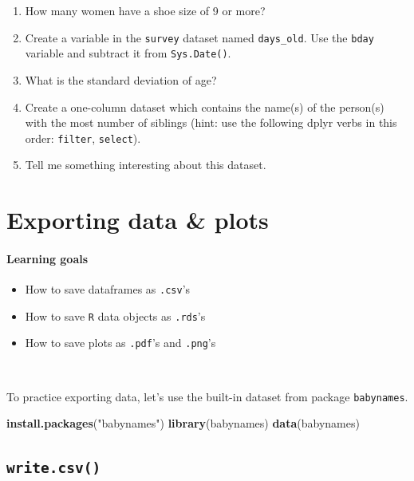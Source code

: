 \documentclass[
]{book}
\newenvironment{Shaded}{\begin{snugshade}}{\end{snugshade}}
\newcommand{\KeywordTok}[1]{\textcolor[rgb]{0.13,0.29,0.53}{\textbf{#1}}}
\newcommand{\NormalTok}[1]{#1}
\newcommand{\StringTok}[1]{\textcolor[rgb]{0.31,0.60,0.02}{#1}}
\providecommand{\tightlist}{%
  \setlength{\itemsep}{0pt}\setlength{\parskip}{0pt}}
\begin{document}
\begin{enumerate}
\item
  How many women have a shoe size of 9 or more?
\item
  Create a variable in the \texttt{survey} dataset named \texttt{days\_old}. Use the \texttt{bday} variable and subtract it from \texttt{Sys.Date()}.
\item
  What is the standard deviation of age?
\item
  Create a one-column dataset which contains the name(s) of the person(s) with the most number of siblings (hint: use the following dplyr verbs in this order: \texttt{filter}, \texttt{select}).
\item
  Tell me something interesting about this dataset.
\end{enumerate}

\hypertarget{exporting-data-plots}{%
\chapter{Exporting data \& plots}\label{exporting-data-plots}}

\hypertarget{learning-goals-11}{%
\subsubsection*{Learning goals}\label{learning-goals-11}}

\begin{itemize}
\tightlist
\item
  How to save dataframes as \texttt{.csv}'s
\item
  How to save \texttt{R} data objects as \texttt{.rds}'s
\item
  How to save plots as \texttt{.pdf}'s and \texttt{.png}'s
\end{itemize}

~

To practice exporting data, let's use the built-in dataset from package \texttt{babynames}.

\begin{Shaded}
\begin{Highlighting}[]
\KeywordTok{install.packages}\NormalTok{(}\StringTok{"babynames"}\NormalTok{)}
\KeywordTok{library}\NormalTok{(babynames)}
\KeywordTok{data}\NormalTok{(babynames)}
\end{Highlighting}
\end{Shaded}

\hypertarget{write.csv}{%
\section*{\texorpdfstring{\texttt{write.csv()}}{write.csv()}}\label{write.csv}}
\end{document}
